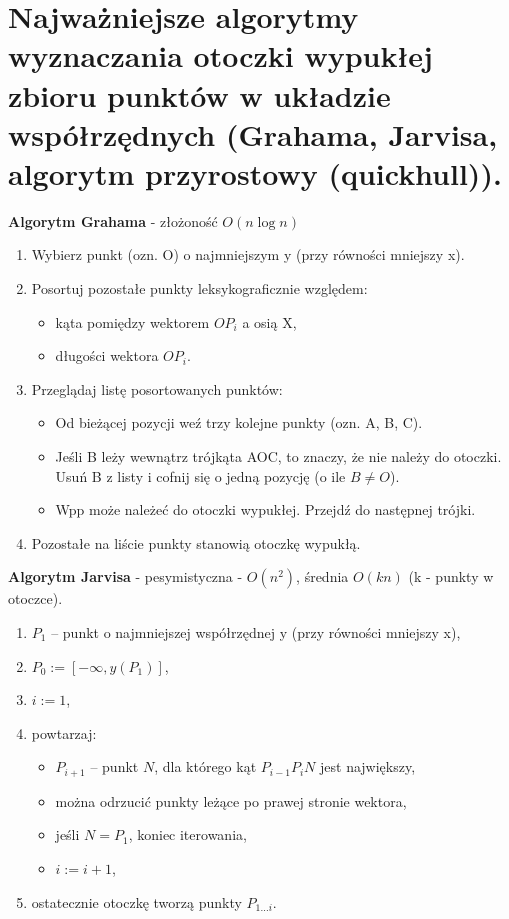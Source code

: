 \documentclass[main.tex]{subfiles}
\begin{document}
    \section{Najważniejsze algorytmy wyznaczania otoczki wypukłej zbioru punktów w układzie współrzędnych (Grahama, Jarvisa, algorytm przyrostowy (quickhull)).}

    \textbf{Algorytm Grahama} - złożoność $O(n \log n)$
    \begin{enumerate}[noitemsep]
        \item Wybierz punkt (ozn. O) o najmniejszym y (przy równości mniejszy x).
        \item Posortuj pozostałe punkty leksykograficznie względem:
        \begin{itemize}[noitemsep]
            \item kąta pomiędzy wektorem $OP_i$ a osią X,
            \item długości wektora $OP_i$.
        \end{itemize}
        \item Przeglądaj listę posortowanych punktów:
        \begin{itemize}[noitemsep]
            \item Od bieżącej pozycji weź trzy kolejne punkty (ozn. A, B, C).
            \item Jeśli B leży wewnątrz trójkąta AOC, to znaczy, że nie należy do otoczki. Usuń B z listy i cofnij
            się o jedną pozycję (o ile $B \neq O$).
            \item Wpp może należeć do otoczki wypukłej. Przejdź do następnej trójki.
        \end{itemize}
        \item Pozostałe na liście punkty stanowią otoczkę wypukłą.
    \end{enumerate}

    \noindent \textbf{Algorytm Jarvisa} - pesymistyczna - $O(n^2)$, średnia $O(kn)$ (k - punkty w otoczce).
    \begin{enumerate}[noitemsep]
        \item $P_1$ – punkt o najmniejszej współrzędnej y (przy równości mniejszy x),
        \item $P_{0}:=[-\infty ,y(P_{1})]$,
        \item $i:=1$,
        \item powtarzaj:
        \begin{itemize}[noitemsep]
            \item $P_{i+1}$ – punkt $N$, dla którego kąt $P_{i-1}P_{i}N$ jest największy,
            \item można odrzucić punkty leżące po prawej stronie wektora,
            \item jeśli $N=P_{1}$, koniec iterowania,
            \item $i:=i+1$,
        \end{itemize}
        \item ostatecznie otoczkę tworzą punkty $P_{1\dots i}$.
    \end{enumerate}
\end{document}
